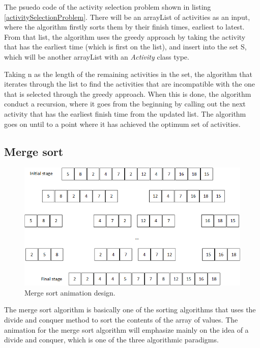 \newpage



The psuedo code of the activity selection problem shown in listing \ref{activitySelectionProblem}. There will be an arrayList of activities as an input, where the algorithm firstly sorts them by their finish times, earliest to latest. From that list, the algorithm uses the greedy approach by taking the activity that has the earliest time (which is first on the list), and insert into the set S, which will be another arrayList with an \textit{Activity} class type. 

Taking n as the length of the remaining activities in the set, the algorithm that iterates through the list to find the activities that are incompatible with the one that is selected through the greedy approach. When this is done, the algorithm conduct a recursion, where it goes from the beginning by calling out the next activity that has the earliest finish time from the updated list. The algorithm goes on until to a point where it has achieved the optimum set of activities.


\subsection{Merge sort}

\begin{figure}[H]
\centering
\includegraphics[scale=0.9]{images/report_images/animationDesignMergeSort.png}
\caption{Merge sort animation design.}
\label{animationDesignMergeSort}
\end{figure}

The merge sort algorithm is basically one of the sorting algorithms that uses the divide and conquer method to sort the contents of the array of values. The animation for the merge sort algorithm will emphasize mainly on the idea of a divide and conquer, which is one of the three algorithmic paradigms. 

